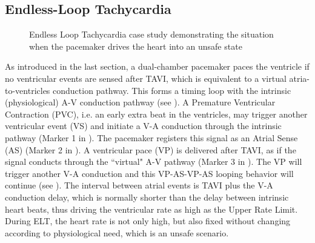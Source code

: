 \subsection{Endless-Loop Tachycardia}
\begin{figure}
\centering
	\caption{Endless Loop Tachycardia case study demonstrating the situation when the pacemaker drives the heart into an unsafe state \cite{vhm_iccps11}}
\end{figure}

As introduced in the last section, a dual-chamber pacemaker paces the ventricle if no ventricular events are sensed after TAVI, which is equivalent to a virtual atria-to-ventricles conduction pathway. 
This forms a timing loop with the intrinsic (physiological) A-V conduction pathway (see ). 
A Premature Ventricular Contraction (PVC), i.e. an early extra beat in the ventricles, may trigger another ventricular event (VS) and initiate a V-A conduction through the intrinsic pathway (Marker 1 in ). 
The pacemaker registers this signal as an Atrial Sense (AS) (Marker 2 in ). 
A ventricular pace (VP) is delivered after TAVI, as if the signal conducts through the ``virtual" A-V pathway (Marker 3 in ). 
The VP will trigger another V-A conduction and this VP-AS-VP-AS looping behavior will continue (see ). 
The interval between atrial events is TAVI plus the V-A conduction delay, which is normally shorter than the delay between intrinsic heart beats, thus driving the ventricular rate as high as the Upper Rate Limit. 
During ELT, the heart rate is not only high, but also fixed without changing according to physiological need, which is an unsafe scenario.

